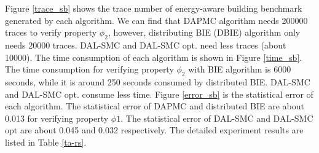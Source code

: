 \begin{figure}[htbp]
\end{figure}
Figure \ref{trace_sb} shows the trace number of energy-aware building benchmark generated by each algorithm. We can find that DAPMC algorithm needs 200000 traces to verify property $\phi_2$, however, distributing BIE (DBIE) algorithm only needs 20000 traces. DAL-SMC and DAL-SMC opt. need less traces (about 10000). The time consumption of each algorithm is shown in Figure \ref{time_sb}. The time consumption for verifying property $\phi_2$ with BIE algorithm is 6000 seconds, while it is around 250 seconds consumed by distributed BIE. DAL-SMC and DAL-SMC opt. consume less time. Figure \ref{error_sb} is the statistical error of each algorithm. The statistical error of DAPMC and distributed BIE are about 0.013 for verifying property $\phi1$. The statistical error of DAL-SMC and DAL-SMC opt are about 0.045 and 0.032 respectively. The detailed experiment results are listed in Table \ref{ta-rs}. 
